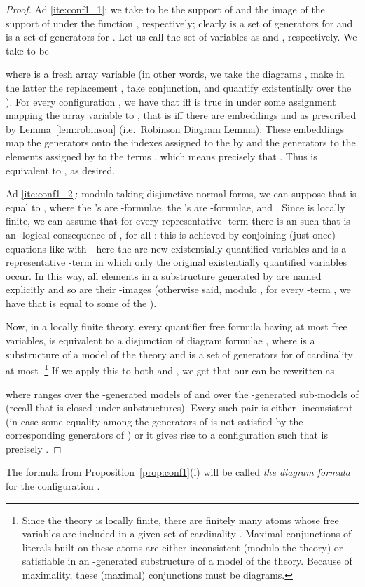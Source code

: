 \documentclass{LMCS}
\theoremstyle{plain}\newtheorem{assumption}[thm]{Assumption}
\theoremstyle{plain}\newtheorem{proposition}[thm]{Proposition}
\theoremstyle{plain}\newtheorem{property}[thm]{Property}
\theoremstyle{plain}\newtheorem{example}[thm]{Example}
\theoremstyle{plain}\newtheorem{claim}[thm]{Claim}
\theoremstyle{plain}\newtheorem{lemma}[thm]{Lemma}
\begin{document}
\begin{proof}
Ad \eqref{ite:conf1_1}: we take  to be the support of 
  and the image of the support of  under the function ,
  respectively; clearly  is a set of generators for  and 
  is a set of generators for . Let us call the set of variables
   as  and , respectively. We take  to be
  
  where  is a fresh array variable (in other words, we take the
  diagrams , make in the latter the
  replacement , take conjunction, and quantify
  existentially over the ). For every configuration ,
  we have that  iff  is true in  under some assignment  mapping the array variable  to , that is iff there are
  embeddings  and  as prescribed by Lemma~\ref{lem:robinson} (i.e.\ Robinson
  Diagram Lemma). These embeddings map the generators  onto the
  indexes assigned to the  by  and the generators 
  to the elements assigned by  to the terms , which
  means precisely that . Thus  is equivalent to , as desired.

  Ad \eqref{ite:conf1_2}: modulo taking disjunctive normal forms, we
  can suppose that  is equal to , where the 's are
  -formulae, the 's are -formulae, and
  .  Since  is locally finite, we can
  assume that for every representative -term  there is an
   such that  is an -logical consequence of
  , for all : this is achieved by conjoining (just once)
  equations like  with  - here the  are new
  existentially quantified variables and  is a representative
  -term in which only the original existentially quantified
  variables occur. In this way, all elements in a substructure
  generated by  are named explicitly and so are their
  -images  (otherwise said, modulo , for
  every -term , we have that  is equal to
  some of the ).

  Now, in a locally finite theory, every quantifier free formula
   having at most  free variables, is equivalent to a
  disjunction of diagram formulae , where  is a
  substructure of a model of the theory and  is a set of generators
  for  of cardinality at most .\footnote{Since the theory is
    locally finite, there are finitely many atoms whose free variables
    are included in a given set of cardinality . Maximal
    conjunctions of literals built on these atoms are either
    inconsistent (modulo the theory) or satisfiable in an
    -generated substructure of a model of the theory. Because of
    maximality, these (maximal) conjunctions must be diagrams.} If we
  apply this to both  and , we get that our  can be
  rewritten as
  
  where  ranges over the -generated models of  and 
  over the -generated sub-models of  (recall that  is
  closed under substructures). Every such pair  is either
  -inconsistent (in case some equality among the generators of
   is not satisfied by the corresponding generators of ) or
  it gives rise to a configuration  such that  is precisely
  .
\end{proof}
The formula  from Proposition~\ref{prop:conf1}(i) will be called
\emph{the diagram formula} for the configuration .
\end{document}
